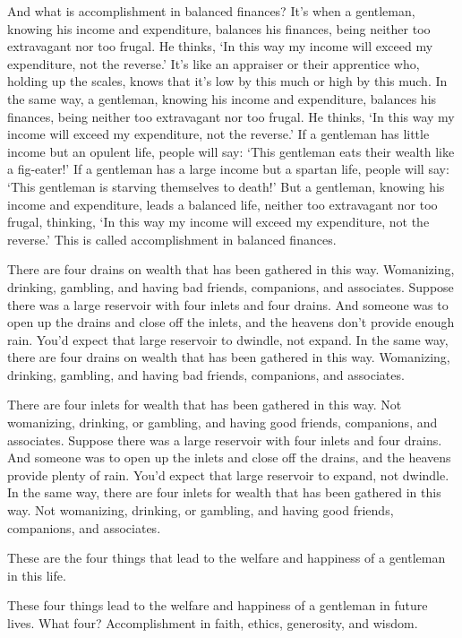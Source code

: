 \documentclass[12pt,openany]{book}%
\begin{document}
And what is accomplishment in balanced finances? It’s when a gentleman, knowing his income and expenditure, balances his finances, being neither too extravagant nor too frugal. He thinks, ‘In this way my income will exceed my expenditure, not the reverse.’ It’s like an appraiser or their apprentice who, holding up the scales, knows that it’s low by this much or high by this much. In the same way, a gentleman, knowing his income and expenditure, balances his finances, being neither too extravagant nor too frugal. He thinks, ‘In this way my income will exceed my expenditure, not the reverse.’ If a gentleman has little income but an opulent life, people will say: ‘This gentleman eats their wealth like a fig-eater!’ If a gentleman has a large income but a spartan life, people will say: ‘This gentleman is starving themselves to death!’ But a gentleman, knowing his income and expenditure, leads a balanced life, neither too extravagant nor too frugal, thinking, ‘In this way my income will exceed my expenditure, not the reverse.’ This is called accomplishment in balanced finances. 

There are four drains on wealth that has been gathered in this way. Womanizing, drinking, gambling, and having bad friends, companions, and associates. Suppose there was a large reservoir with four inlets and four drains. And someone was to open up the drains and close off the inlets, and the heavens don’t provide enough rain. You’d expect that large reservoir to dwindle, not expand. In the same way, there are four drains on wealth that has been gathered in this way. Womanizing, drinking, gambling, and having bad friends, companions, and associates. 

There are four inlets for wealth that has been gathered in this way. Not womanizing, drinking, or gambling, and having good friends, companions, and associates. Suppose there was a large reservoir with four inlets and four drains. And someone was to open up the inlets and close off the drains, and the heavens provide plenty of rain. You’d expect that large reservoir to expand, not dwindle. In the same way, there are four inlets for wealth that has been gathered in this way. Not womanizing, drinking, or gambling, and having good friends, companions, and associates. 

These are the four things that lead to the welfare and happiness of a gentleman in this life. 

These four things lead to the welfare and happiness of a gentleman in future lives. What four? Accomplishment in faith, ethics, generosity, and wisdom. 
\end{document}
